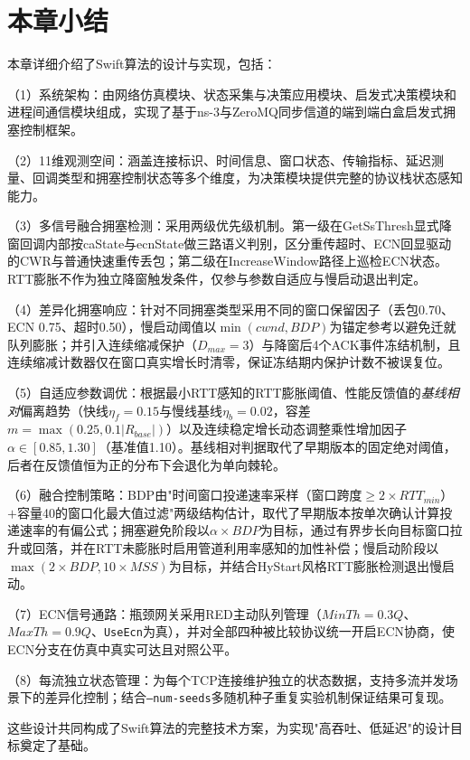 \section{本章小结}

本章详细介绍了Swift算法的设计与实现，包括：

（1）系统架构：由网络仿真模块、状态采集与决策应用模块、启发式决策模块和进程间通信模块组成，实现了基于ns-3与ZeroMQ同步信道的端到端白盒启发式拥塞控制框架。

（2）11维观测空间：涵盖连接标识、时间信息、窗口状态、传输指标、延迟测量、回调类型和拥塞控制状态等多个维度，为决策模块提供完整的协议栈状态感知能力。

（3）多信号融合拥塞检测：采用两级优先级机制。第一级在GetSsThresh显式降窗回调内部按caState与ecnState做三路语义判别，区分重传超时、ECN回显驱动的CWR与普通快速重传丢包；第二级在IncreaseWindow路径上巡检ECN状态。RTT膨胀不作为独立降窗触发条件，仅参与参数自适应与慢启动退出判定。

（4）差异化拥塞响应：针对不同拥塞类型采用不同的窗口保留因子（丢包0.70、ECN 0.75、超时0.50），慢启动阈值以$\min(cwnd, BDP)$为锚定参考以避免迁就队列膨胀；并引入连续缩减保护（$D_{max}=3$）与降窗后4个ACK事件冻结机制，且连续缩减计数器仅在窗口真实增长时清零，保证冻结期内保护计数不被误复位。

（5）自适应参数调优：根据最小RTT感知的RTT膨胀阈值、性能反馈值的\emph{基线相对}偏离趋势（快线$\eta_f=0.15$与慢线基线$\eta_b=0.02$，容差$m=\max(0.25, 0.1|R_{base}|)$）以及连续稳定增长动态调整乘性增加因子$\alpha \in [0.85, 1.30]$（基准值1.10）。基线相对判据取代了早期版本的固定绝对阈值，后者在反馈值恒为正的分布下会退化为单向棘轮。

（6）融合控制策略：BDP由"时间窗口投递速率采样（窗口跨度$\ge 2 \times RTT_{min}$）$+$容量40的窗口化最大值过滤"两级结构估计，取代了早期版本按单次确认计算投递速率的有偏公式；拥塞避免阶段以$\alpha \times BDP$为目标，通过有界步长向目标窗口拉升或回落，并在RTT未膨胀时启用管道利用率感知的加性补偿；慢启动阶段以$\max(2 \times BDP, 10 \times MSS)$为目标，并结合HyStart风格RTT膨胀检测退出慢启动。

（7）ECN信号通路：瓶颈网关采用RED主动队列管理（$MinTh = 0.3Q$、$MaxTh = 0.9Q$、\texttt{UseEcn}为真），并对全部四种被比较协议统一开启ECN协商，使ECN分支在仿真中真实可达且对照公平。

（8）每流独立状态管理：为每个TCP连接维护独立的状态数据，支持多流并发场景下的差异化控制；结合\texttt{--num-seeds}多随机种子重复实验机制保证结果可复现。

这些设计共同构成了Swift算法的完整技术方案，为实现"高吞吐、低延迟"的设计目标奠定了基础。
